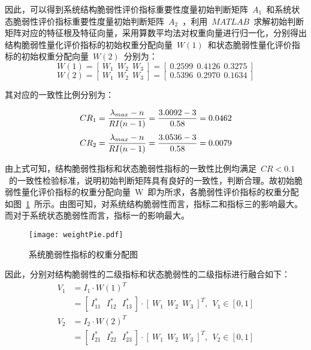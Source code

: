 因此，可以得到系统结构脆弱性评价指标重要性度量初始判断矩阵~$A_1$~和系统状态脆弱性评价指标重要性度量初始判断矩阵~$A_2$~，利用~$MATLAB$~求解初始判断矩阵对应的特征根及特征向量，采用算数平均法对权重向量进行归一化，分别得出结构脆弱性量化评价指标的初始权重分配向量~$W(1)$~和状态脆弱性量化评价指标的初始权重分配向量~$W(2)$~分别为：
\begin{equation}\label{equ:chap4:Index15}
    W(1)=\left[~W_1~~W_2~~W_3~\right]=\left[~0.2599~~0.4126~~0.3275~\right]
\end{equation}
\begin{equation}\label{equ:chap4:Index16}
    W(2)=\left[~W_1~~W_2~~W_3~\right]=\left[~0.5396~~0.2970~~0.1634~\right]
\end{equation}

其对应的一致性比例分别为：

\begin{equation}\label{equ:chap4:Index17}
    CR_1=\displaystyle\frac{\lambda_{max}-n}{RI(n-1)}=\displaystyle\frac{3.0092-3}{0.58}=0.0462
    \end{equation}
\begin{equation}\label{equ:chap4:Index18}
    CR_2=\displaystyle\frac{\lambda_{max}-n}{RI(n-1)}=\displaystyle\frac{3.0536-3}{0.58}=0.0079
\end{equation}

由上式可知，结构脆弱性指标和状态脆弱性指标的一致性比例均满足~$CR<0.1$~的一致性检验标准，说明初始判断矩阵具有良好的一致性，判断合理。故初始脆弱性量化评价指标的权重分配向量~W~即为所求，各脆弱性评价指标的权重分配如图~\ref{fig:weightPie}~所示。由图可知，对系统结构脆弱性而言，指标二和指标三的影响最大。而对于系统状态脆弱性而言，指标一的影响最大。
\begin{figure}[H] %
  \centering
  \texttt{[image: weightPie.pdf]}
  \caption{系统脆弱性指标的权重分配图}
  \label{fig:weightPie}
\end{figure}

因此，分别对结构脆弱性的二级指标和状态脆弱性的二级指标进行融合如下：
\begin{equation}\label{equ:chap4:Index19}
\begin{split}
    V_1&=I_1\cdot W(1)^T\\
      &=\left[~I_{11}^{\ast}~~~I_{12}^{\ast}~~~I_{13}^{\ast}~\right]\cdot \left[~W_1~~W_2~~W_3~\right]^T,~~V_1\in \left[0,1\right]
\end{split}
\end{equation}
\begin{equation}\label{equ:chap4:Index20}
\begin{split}
    V_2&=I_2\cdot W(2)^T\\
      &=\left[~I_{21}^{\ast}~~~I_{22}^{\ast}~~~I_{23}^{\ast}~\right]\cdot \left[~W_1~~W_2~~W_3~\right]^T,~~V_2\in \left[0,1\right]
\end{split}
\end{equation}

